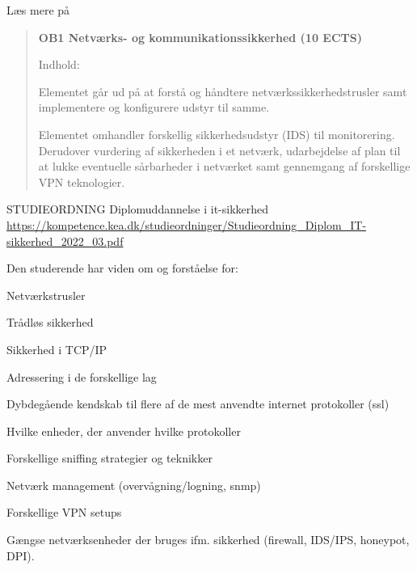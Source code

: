 \documentclass[Screen16to9,17pt]{foils}
\begin{document}
{}


\hlkprofil



Læs mere på 


\begin{quote}\small
{\bf OB1 Netværks- og kommunikationssikkerhed (10 ECTS)}

Indhold:

Elementet går ud på at forstå og håndtere netværkssikkerhedstrusler samt implementere og
konfigurere udstyr til samme.

Elementet omhandler forskellig sikkerhedsudstyr (IDS) til monitorering. Derudover vurdering
af sikkerheden i et netværk, udarbejdelse af plan til at lukke eventuelle sårbarheder i
netværket samt gennemgang af forskellige VPN teknologier.
\end{quote}

STUDIEORDNING Diplomuddannelse i it-sikkerhed\\
{\footnotesize
\url{https://kompetence.kea.dk/studieordninger/Studieordning_Diplom_IT-sikkerhed_2022_03.pdf}}



Den studerende har viden om og forståelse for:
\begin{list2}
\item Netværkstrusler
\item Trådløs sikkerhed
\item Sikkerhed i TCP/IP
\item Adressering i de forskellige lag
\item Dybdegående kendskab til flere af de mest anvendte internet protokoller (ssl)
\item Hvilke enheder, der anvender hvilke protokoller
\item Forskellige sniffing strategier og teknikker
\item Netværk management (overvågning/logning, snmp)
\item Forskellige VPN setups
\item Gængse netværksenheder der bruges ifm. sikkerhed (firewall, IDS/IPS, honeypot,
DPI).
\end{list2}
\end{document}
